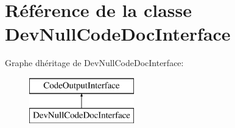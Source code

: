 \hypertarget{class_dev_null_code_doc_interface}{}\section{Référence de la classe Dev\+Null\+Code\+Doc\+Interface}
\label{class_dev_null_code_doc_interface}
Graphe d\textquotesingle{}héritage de Dev\+Null\+Code\+Doc\+Interface\+:\begin{figure}[H]
\begin{center}
\leavevmode
\includegraphics[height=2.000000cm]{class_dev_null_code_doc_interface}
\end{center}
\end{figure}
